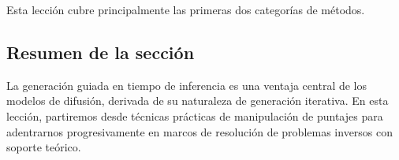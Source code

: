 Esta lección cubre principalmente las primeras dos categorías de métodos.

\subsection{Resumen de la sección}

La generación guiada en tiempo de inferencia es una ventaja central de los modelos de difusión, derivada de su naturaleza de generación iterativa. En esta lección, partiremos desde técnicas prácticas de manipulación de puntajes para adentrarnos progresivamente en marcos de resolución de problemas inversos con soporte teórico.



